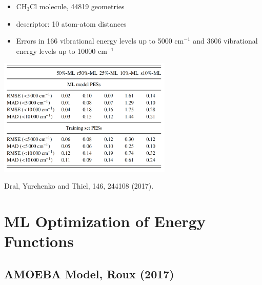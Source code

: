 \documentclass[handout]{beamer} %
\begin{document}
\begin{frame}
\begin{itemize}
\item \scriptsize{CH$_3$Cl molecule, 44819 geometries}
\item descriptor: 10 atom-atom distances
\item Errors in 166 vibrational energy levels up to 5000 cm$^{-1}$ and 3606 vibrational energy levels up to 10000 cm$^{-1}$

\end{itemize}
\begin{center}
\includegraphics[height=2.2in]{figures_ml/Thiel_frequency.png}
\end{center}
\vspace{5mm}
\begin{center}
\footnotesize{Dral, Yurchenko and Thiel, 146, 244108 (2017).}
\end{center} 
\end{frame}


\section{ML Optimization of Energy Functions} 

\subsection{AMOEBA Model, Roux (2017)}
\end{document}
